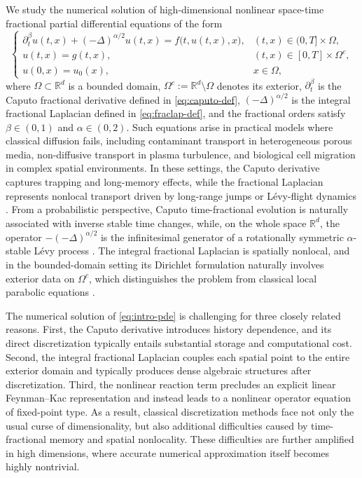 \documentclass[a4paper,fleqn]{cas-sc}
\begin{document}
We study the numerical solution of high-dimensional nonlinear space-time fractional partial differential equations of the form
\begin{equation}\label{eq:intro-pde}
\begin{cases}
\partial_t^\beta u(t,x) + (-\Delta)^{\alpha/2}u(t,x) = f\bigl(t,u(t,x),x\bigr), & (t,x)\in (0,T]\times\Omega,\\
u(t,x)=g(t,x), & (t,x)\in [0,T]\times \Omega^c,\\
u(0,x)=u_0(x), & x\in \Omega,
\end{cases}
\end{equation}
where $\Omega\subset\mathbb{R}^d$ is a bounded domain, 
$\Omega^c:=\mathbb{R}^d\setminus\Omega$ denotes its exterior, 
$\partial_t^\beta$ is the Caputo fractional derivative defined in 
\eqref{eq:caputo-def}, $(-\Delta)^{\alpha/2}$ is the integral fractional 
Laplacian defined in \eqref{eq:fraclap-def}, and the fractional orders satisfy 
$\beta\in(0,1)$ and $\alpha\in(0,2)$. Such equations arise in practical models where classical diffusion fails, including contaminant transport in heterogeneous porous media, non-diffusive transport in plasma turbulence, and biological cell migration in complex spatial environments. In these settings, the Caputo derivative captures trapping and long-memory effects, while the fractional Laplacian represents nonlocal transport driven by long-range jumps or L\'evy-flight dynamics
\cite{BensonWheatcraftMeerschaert2000FractionalADE,
delCastilloNegreteCarrerasLynch2004PlasmaFractionalDiffusion,
CusimanoBurrageBurrage2013CellMigrationFractional}. From a probabilistic perspective, Caputo time-fractional evolution is naturally associated with inverse stable time changes, while, on the whole space $\mathbb{R}^d$, the operator $-(-\Delta)^{\alpha/2}$ is the infinitesimal generator of a rotationally symmetric $\alpha$-stable L\'evy process \cite{BaeumerMeerschaert2001StochasticCauchy,MeerschaertNaneVellaisamy2009BoundedCauchy,Kwasnicki2017TenDefs}. The integral fractional Laplacian is spatially nonlocal, and in the bounded-domain setting its Dirichlet formulation naturally involves exterior data on $\Omega^c$, which distinguishes the problem from classical local parabolic equations \cite{LischkePangEtal2020WhatFracLaplacian,DEliaGunzburger2013BoundedFracLap}.

The numerical solution of \eqref{eq:intro-pde} is challenging for three closely related reasons. First, the Caputo derivative introduces history dependence, and its direct discretization typically entails substantial storage and computational cost. Second, the integral fractional Laplacian couples each spatial point to the entire exterior domain and typically produces dense algebraic structures after discretization. Third, the nonlinear reaction term precludes an explicit linear Feynman--Kac representation and instead leads to a nonlinear operator equation of fixed-point type. As a result, classical discretization methods face not only the usual curse of dimensionality, but also additional difficulties caused by time-fractional memory and spatial nonlocality. These difficulties are further amplified in high dimensions, where accurate numerical approximation itself becomes highly nontrivial.
\end{document}
